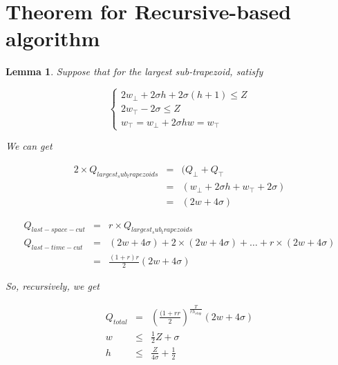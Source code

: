 \documentclass[10pt]{article}
\newtheorem{lemma}[theorem]{Lemma}
\begin{document}
\section*{Theorem for Recursive-based algorithm}
\begin{lemma}
Suppose that for the largest sub-trapezoid, satisfy 

\begin{equation}
\left\lbrace
\begin{array}{l}
2 w_{\bot} + 2 \sigma h + 2 \sigma (h+1) \le Z \\
2 w_{\top} - 2 \sigma \le Z \\
w_{\top} = w_{\bot} + 2 \sigma h
w = w_{\top}
\end{array}
\right.
\end{equation}

We can get

\begin{eqnarray*}
2 \times Q_{largest_sub_trapezoids} & = & (Q_{\bot} + Q_{\top} \\
								   & = & (w_{\bot} + 2 \sigma h + w_{\top} + 2 \sigma) \\
								   & = & (2 w + 4 \sigma)
\end{eqnarray*}

\begin{eqnarray*}
Q_{last-space-cut} & = & r \times Q_{largest_sub_trapezoids} \\
 Q_{last-time-cut} & = & (2 w + 4 \sigma) + 2 \times (2 w + 4 \sigma) + \ldots + r \times (2 w + 4 \sigma) \\
 				   & = & \frac{(1+r) r}{2} (2 w + 4 \sigma)
\end{eqnarray*}

So, recursively, we get

\begin{eqnarray*}
Q_{total} & = & (\frac{(1+r r}{2})^{\frac{T}{r h_{stop}}} (2 w + 4 \sigma) \\
        w & \le & \frac{1}{2} Z + \sigma \\
        h & \le & \frac{Z}{4 \sigma} + \frac{1}{2}
\end{eqnarray*}
\end{lemma}
\end{document}
